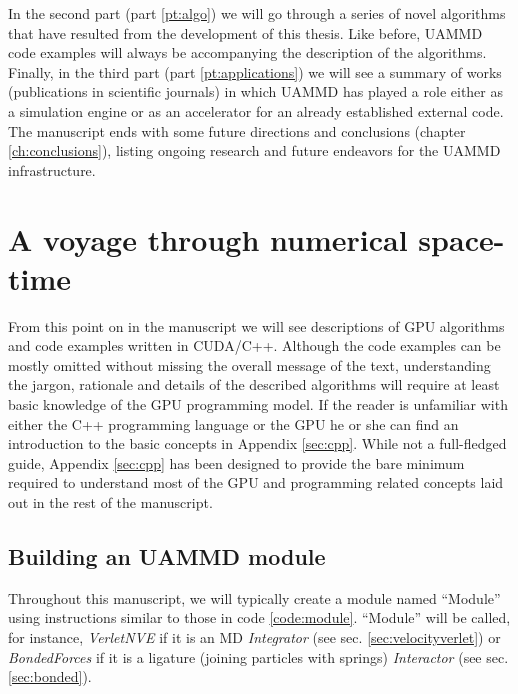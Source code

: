 \documentclass[ twoside,openright,titlepage,numbers=noenddot,%
headinclude,footinclude,cleardoublepage=empty,abstract=on,
BCOR=5mm,paper=b5,fontsize=11pt, dvipsnames
]{scrreprt}
\newcommand{\uammd}{\gls{UAMMD}\xspace}
\begin{document}
 In the second part (part \ref{pt:algo}) we will go through a series of novel algorithms that have resulted from the development of this thesis. Like before, \uammd code examples will always be accompanying the description of the algorithms. Finally, in the third part (part \ref{pt:applications}) we will see a summary of works (publications in scientific journals) in which \uammd has played a role either as a simulation engine or as an accelerator for an already established external code. The manuscript ends with some future directions and conclusions (chapter \ref{ch:conclusions}), listing ongoing research and future endeavors for the \uammd infrastructure.



\cleardoublepage
 
\newpage

\cleardoublepage

\part{A voyage through numerical space-time}\label{part:voyage}


From this point on in the manuscript we will see descriptions of GPU algorithms and code examples written in CUDA/C++. Although the code examples can be mostly omitted without missing the overall message of the text, understanding the jargon, rationale and details of the described algorithms will require at least basic knowledge of the GPU programming model. If the reader is unfamiliar with either the C++ programming language or the GPU he or she can find an introduction to the basic concepts in Appendix \ref{sec:cpp}. While not a full-fledged guide, Appendix \ref{sec:cpp} has been designed to provide the bare minimum required to understand most of the GPU and programming related concepts laid out in the rest of the manuscript.

\chapter{Building an UAMMD module}

Throughout this manuscript, we will typically create a module named ``Module'' using instructions similar to those in code \ref{code:module}. ``Module'' will be called, for instance, \emph{VerletNVE} if it is an \gls{MD} \emph{Integrator} (see sec. \ref{sec:velocityverlet}) or \emph{BondedForces} if it is a ligature (joining particles with springs) \emph{Interactor} (see sec. \ref{sec:bonded}).
\end{document}
